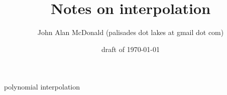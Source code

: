 \documentclass[11pt]{PalisadesLakesBook}
\title{Notes on interpolation}
\author{John Alan McDonald 
(palisades dot lakes at gmail dot com)}
\date{draft of \today}
\begin{document}
\maketitle
{}
\def\sharedFolder{../../shared/}
{polynomial}
{interpolation}
\end{document}

